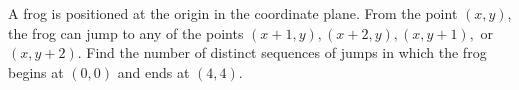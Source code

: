 A frog is positioned at the origin in the coordinate plane. From the point $(x,y)$, the frog can jump to any of the points $(x+1, y), (x+2, y), (x, y+1),$ or $(x, y+2)$. Find the number of distinct sequences of jumps in which the frog begins at $(0,0)$ and ends at $(4,4)$.